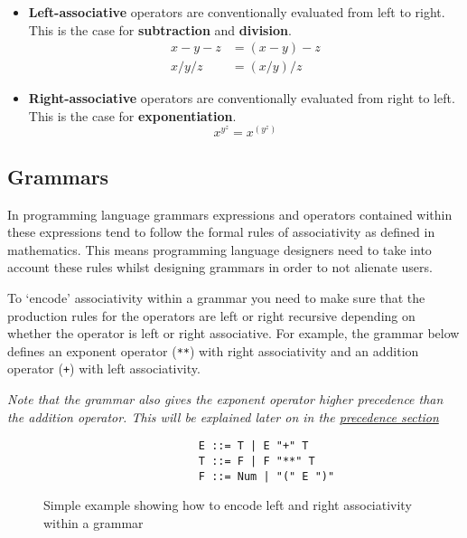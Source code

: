 \documentclass[12pt, letterpaper]{article}
\theoremstyle{definition}
\begin{document}
\begin{itemize}
    \item \textbf{Left-associative} operators are conventionally evaluated from left to right. This is the case for \textbf{subtraction} and \textbf{division}.
    \begin{equation}
        \begin{split}
            x - y - z &= (x - y) - z\\
            x / y / z &= (x / y) / z
        \end{split}
        \nonumber
    \end{equation}
    \item \textbf{Right-associative} operators are conventionally evaluated from right to left. This is the case for \textbf{exponentiation}.
    \begin{equation}
        x^{y^z} = x^{(y^z)}
        \nonumber
    \end{equation}
\end{itemize}

\subsection{Grammars}

In programming language grammars expressions and operators contained within these expressions tend to follow the formal rules of associativity as defined in mathematics. This means programming language designers need to take into account these rules whilst designing grammars in order to not alienate users.

To `encode' associativity within a grammar you need to make sure that the production rules for the operators are left or right recursive depending on whether the operator is left or right associative. For example, the grammar below defines an exponent operator (\verb|**|) with right associativity and an addition operator (\verb|+|) with left associativity.

\textit{Note that the grammar also gives the exponent operator higher precedence than the addition operator. This will be explained later on in the \hyperref[sec:precedence]{precedence section}}

\begin{figure}[H]
    \begin{center}
        \begin{verbatim}
                        E ::= T | E "+" T
                        T ::= F | F "**" T
                        F ::= Num | "(" E ")"
        \end{verbatim}
    \end{center}
    \vspace{-1.5em}
    \caption{Simple example showing how to encode left and right associativity within a grammar}
\end{figure}
\end{document}
